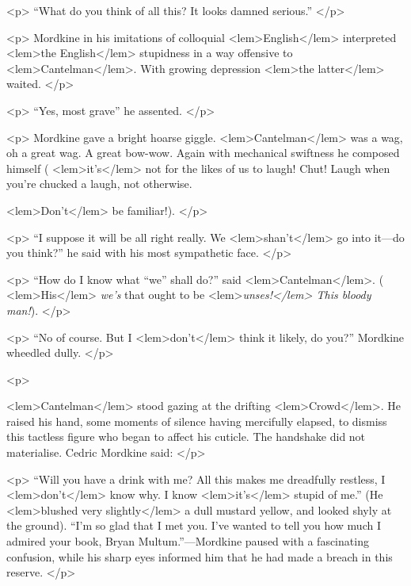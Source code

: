 {{				<p>
				“What do you think of all this? It looks damned serious.” 
 				</p> 

				<p>
				Mordkine in his imitations of colloquial 
<lem>English</lem>{} interpreted 
<lem>the English</lem>
					{} 
				stupidness 
				in a way offensive to 
<lem>Cantelman</lem>{}. With growing depression 
<lem>the latter</lem>
					{} 
				waited. 
 				</p> 

				<p>
				“Yes, most grave” he assented. 
 				</p> 

				<p>
				Mordkine gave a bright hoarse giggle. 
<lem>Cantelman</lem>
					{} 
				was a wag, oh a great wag. A 
				great bow-wow. Again with mechanical swiftness he composed himself (
<lem>it's</lem>
					{} 
				not for 
				the likes of us to laugh! Chut! Laugh when you're chucked a laugh, not otherwise. 
				
<lem>Don't</lem>
					{} 
				be familiar!). 
				</p> 

				 
				<p>
“I suppose it will be all right really. We 
<lem>shan't</lem>{} go into it---do you think?” he 
				said with his most sympathetic face. 
 				</p> 

				<p>
				“How do I know what “we” shall do?” said 
<lem>Cantelman</lem>{}. (
<lem>His</lem>
					{} 
				\emph{we's} that ought to be 
<lem>\emph{unses!</lem> This bloody man!}{}). 
 				</p> 

				<p>
				“No of course. But I 
<lem>don't</lem>{} think it likely, do you?” Mordkine wheedled dully. 
 				</p> 

				<p>
				
<lem>Cantelman</lem>{} stood gazing at the drifting 
<lem>Crowd</lem>{}. He raised his hand, some moments 
				of silence having mercifully elapsed, to dismiss this tactless figure who 
				began to affect his cuticle. The handshake did not materialise. Cedric Mordkine 
				said: 
 				</p> 

				<p>
				“Will you have a drink with me? All this makes me dreadfully restless, I 
<lem>don't</lem>{} 
				know why. I know 
<lem>it's</lem>
					{} 
				stupid of me.” (He 
<lem>blushed very slightly</lem>
					{} 
				a dull mustard 
				yellow, and looked shyly at the ground). “I'm so glad that I met you. I've wanted 
				to tell you how much I admired your book, Bryan Multum.”---Mordkine paused with 
				a fascinating confusion, while his sharp eyes informed him that he had made a 
				breach in this reserve. 
 				</p> 

}}
